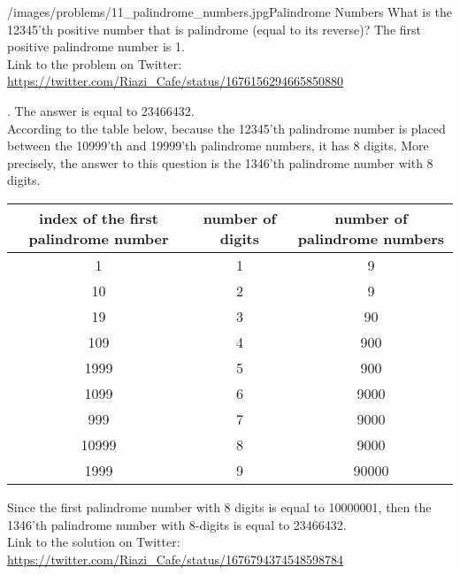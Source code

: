 \begin{problem}{/images/problems/11_palindrome_numbers.jpg}{Palindrome Numbers}
    What is the 12345'th positive number that is palindrome (equal to its reverse)? The first  positive palindrome number is 1.\\[0.2cm]

Link to the problem on Twitter:  \url{https://twitter.com/Riazi_Cafe/status/1676156294665850880}
\end{problem}
\begin{solution}.
The answer is equal to 23466432.\\[0.2cm]

According to the table below, because the 12345'th palindrome number is placed between the 10999'th and 19999'th palindrome numbers, it has 8 digits. More precisely, the answer to this question is the 1346'th palindrome number with 8 digits.

\begin{center}
\begin{tabular}{|c|c|c|}
\hline
 index of the first palindrome number &  number of digits &  number of palindrome numbers \\
\hline
1  & 1 &  9 \\
\hline
10 & 2 & 9 \\
\hline
19 & 3 & 90 \\
\hline
109 & 4 & 900\\
\hline
1999 & 5 & 900\\
\hline
1099 & 6 & 9000\\
\hline
999 & 7 & 9000 \\
\hline
10999 & 8 & 9000\\
\hline
1999 & 9 & 90000\\
\hline
\end{tabular}
\end{center}

Since the first palindrome number with 8 digits is equal to 10000001, then the 1346'th palindrome number with 8-digits is equal to 23466432.\\[0.2cm]

Link to the solution on Twitter:  \url{https://twitter.com/Riazi_Cafe/status/1676794374548598784}
\end{solution}